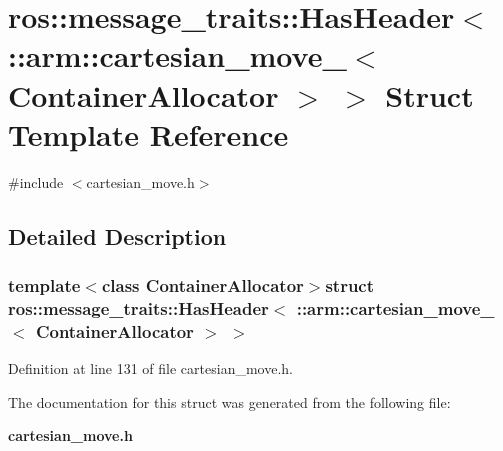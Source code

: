 \section{ros\-:\-:message\-\_\-traits\-:\-:\-Has\-Header$<$ \-:\-:arm\-:\-:cartesian\-\_\-move\-\_\-$<$ \-Container\-Allocator $>$ $>$ \-Struct \-Template \-Reference}
\label{structros_1_1message__traits_1_1HasHeader_3_01_1_1arm_1_1cartesian__move___3_01ContainerAllocator_01_4_01_4}


{\ttfamily \#include $<$cartesian\-\_\-move.\-h$>$}



\subsection{\-Detailed \-Description}
\subsubsection*{template$<$class Container\-Allocator$>$struct ros\-::message\-\_\-traits\-::\-Has\-Header$<$ \-::arm\-::cartesian\-\_\-move\-\_\-$<$ Container\-Allocator $>$ $>$}



\-Definition at line 131 of file cartesian\-\_\-move.\-h.



\-The documentation for this struct was generated from the following file\-:\begin{DoxyCompactItemize}
\item 
{\bf cartesian\-\_\-move.\-h}\end{DoxyCompactItemize}

